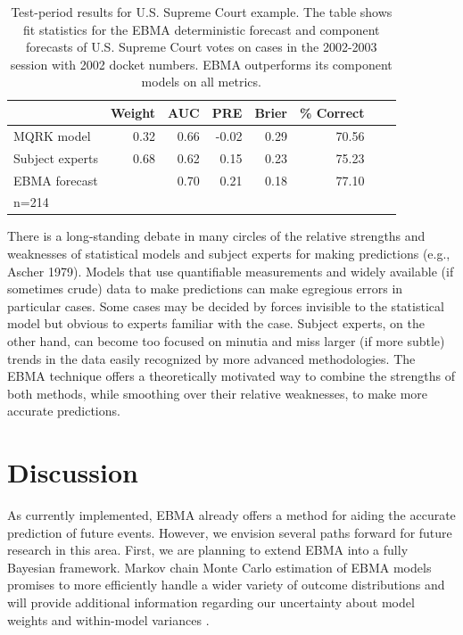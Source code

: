 \begin{table}[ht]
  \caption{\footnotesize Test-period results for U.S. Supreme Court
    example.  The table shows fit statistics for the EBMA deterministic
    forecast and component forecasts of U.S. Supreme Court votes on
    cases in the 2002-2003 session with 2002 docket numbers.   EBMA 
    outperforms its component models on all metrics. }
\label{SC-Res} \small
\begin{center}
\begin{tabular}{lrrrrrrr}
\toprule
 & Weight & AUC & PRE & Brier & \% Correct   \\ 
\midrule
MQRK model& 0.32  & 0.66 & -0.02 & 0.29 & 70.56   \\ 
Subject experts & 0.68 & 0.62 & 0.15 & 0.23 & 75.23  \\ 
EBMA forecast&  & 0.70 & 0.21 & 0.18 & 77.10  \\ 
\bottomrule
n=214 
\end{tabular}
\end{center}
\end{table}


There is a long-standing debate in many circles of the relative
strengths and weaknesses of statistical models and subject experts for
making predictions (e.g., Ascher 1979). Models that use quantifiable
measurements and widely available (if sometimes crude) data to make
predictions can make egregious errors in particular cases. Some cases
may be decided by forces invisible to the statistical model but
obvious to experts familiar with the case. Subject experts, on the
other hand, can become too focused on minutia and miss larger (if more
subtle) trends in the data easily recognized by more advanced
methodologies. The EBMA technique offers a theoretically motivated way
to combine the strengths of both methods, while smoothing over their
relative weaknesses, to make more accurate predictions.

\section{Discussion} %

As currently implemented, EBMA already offers a method for aiding the
accurate prediction of future events.  However, we envision several
paths forward for future research in this area. First, we are planning
to extend EBMA into a fully Bayesian framework. Markov chain Monte
Carlo estimation of EBMA models promises to more efficiently handle a
wider variety of outcome distributions and will provide additional
information regarding our uncertainty about model weights and
within-model variances \citep{Vrugt:2008}.

